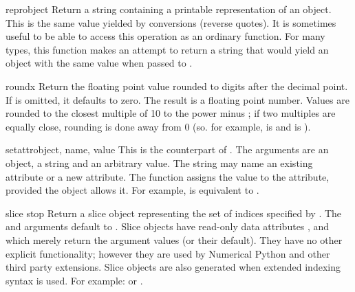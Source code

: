 \begin{funcdesc}{repr}{object}
  Return a string containing a printable representation of an object.
  This is the same value yielded by conversions (reverse quotes).
  It is sometimes useful to be able to access this operation as an
  ordinary function.  For many types, this function makes an attempt
  to return a string that would yield an object with the same value
  when passed to .
\end{funcdesc}

\begin{funcdesc}{round}{x}
  Return the floating point value  rounded to  digits
  after the decimal point.  If  is omitted, it defaults to zero.
  The result is a floating point number.  Values are rounded to the
  closest multiple of 10 to the power minus ; if two multiples
  are equally close, rounding is done away from 0 (so. for example,
   is  and  is ).
\end{funcdesc}

\begin{funcdesc}{setattr}{object, name, value}
  This is the counterpart of .  The arguments are an
  object, a string and an arbitrary value.  The string may name an
  existing attribute or a new attribute.  The function assigns the
  value to the attribute, provided the object allows it.  For example,
   is equivalent to
  .
\end{funcdesc}

\begin{funcdesc}{slice}{ stop}
  Return a slice object representing the set of indices specified by
  .  The 
  and  arguments default to .  Slice objects have
  read-only data attributes ,  and
   which merely return the argument values (or their
  default).  They have no other explicit functionality; however they
  are used by Numerical Python and other third
  party extensions.  Slice objects are also generated when extended
  indexing syntax is used.  For example:  or
  .
\end{funcdesc}

